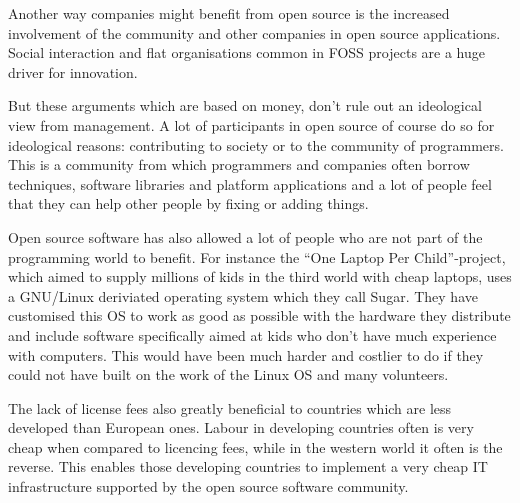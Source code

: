 \documentclass{article}
\begin{document}
Another way companies might benefit from open source is the increased
involvement of the community and other companies in open source applications.
Social interaction and flat organisations common in FOSS projects are a huge
driver for innovation. \cite{conway09} 

But these arguments which are based on money, don't rule out an ideological
view from management. A lot of participants in open source of course do so for
ideological reasons: contributing to society or to the community of
programmers. This is a community from which programmers and companies often
borrow techniques, software libraries and platform applications and a lot of
people feel that they can help other people by fixing or adding things.

Open source software has also allowed a lot of people who are not part of the
programming world to benefit. For instance the ``One Laptop Per
Child''-project, which aimed to supply millions of kids in the third world with
cheap laptops, uses a GNU/Linux deriviated operating system which they call
Sugar. They have customised this OS to work as good as possible with the
hardware they distribute and include software specifically aimed at kids who
don't have much experience with computers.\cite{sugar} This would have been
much harder and costlier to do if they could not have built on the work of the
Linux OS and many volunteers. 

The lack of license fees also greatly beneficial to countries which are less
developed than European ones. Labour in developing countries often is 
very cheap when compared to licencing fees, while in the western world it often
is the reverse. This enables those developing countries to implement a very cheap
IT infrastructure supported by the open source software community.\cite{ghosh03}

{}

\end{document}
